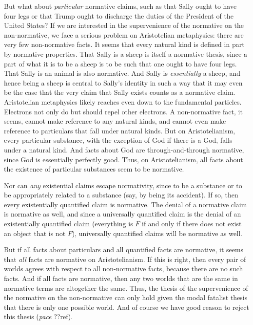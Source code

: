 But what about \textit{particular} normative claims, such as that Sally ought to have four legs
or that Trump ought to discharge the duties of the President of the United States? If we are
interested in the supervenience of the normative on the non-normative, we face a serious problem on
Aristotelian metaphysics: there are very few non-normative facts. It seems that every natural kind
is defined in part by normative properties. That Sally is a sheep is itself a normative thesis,
since a part of what it is to be a sheep is to be such that one ought to have four legs. That Sally
is an animal is also normative. And Sally is \textit{essentially} a sheep, and hence being a sheep
is central to Sally's identity in such a way that it may even be the case that the very claim that
Sally exists counts as a normative claim. Aristotelian metaphysics likely reaches even down to the fundamental
particles. Electrons not only do but should repel other electrons. 
A non-normative fact, it seems, cannot 
make reference to any natural kinds, and cannot even make reference to particulars that fall under natural
kinds. But on Aristotelianism, every particular substance, with the exception of God if there is a God, falls under a natural kind.
And facts about God are through-and-through normative, since God is essentially perfectly good. Thus,
on Aristotelianism, all facts about the existence of particular substances seem to be normative. 

Nor can \textit{any} existential claims escape normativity, since to be a substance or to be appropriately 
related to a substance (say, by being its accident).
If so, then every
existentially quantified claim is normative. The denial of a normative claim is normative as well, and
since a universally quantified claim is the denial of an existentially quantified claim (everything is
$F$ if and only if there does not exist an object that is not $F$), universally quantified claims 
will be normative as well. 

But if all facts about particulars and all quantified facts are normative, it seems that \textit{all} facts
are normative on Aristotelianism.  If this is right, then every pair of worlds agrees with respect to all 
non-normative facts, because there are no such facts. And if all facts are normative, then any two worlds 
that are the same in normative terms are altogether the same. Thus, the thesis of the supervenience of the 
normative on the non-normative can only hold given the modal fatalist thesis that there is only one possible 
world. And of course we have good reason to reject this thesis (\textit{pace} ??ref).

